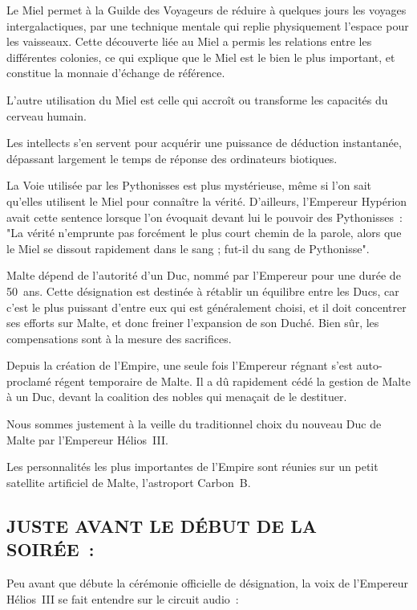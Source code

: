 \documentclass[14pt,twocolumn]{extarticle}
\begin{document}
Le Miel permet à la Guilde des Voyageurs de réduire à quelques jours les
voyages intergalactiques, par une technique mentale qui replie physiquement
l'espace pour les vaisseaux. Cette découverte liée au Miel a permis les
relations entre les différentes colonies, ce qui explique que le Miel est le
bien le plus important, et constitue la monnaie d'échange de référence.

L'autre utilisation du Miel est celle qui accroît ou transforme les capacités
du cerveau humain.

Les intellects s'en servent pour acquérir une puissance de déduction
instantanée, dépassant largement le temps de réponse des ordinateurs biotiques.

La Voie utilisée par les Pythonisses est plus mystérieuse, même si l'on sait
qu'elles utilisent le Miel pour connaître la vérité. D'ailleurs, l'Empereur
Hypérion avait cette sentence lorsque l'on évoquait devant lui le pouvoir des
Pythonisses~: "La vérité n'emprunte pas forcément le plus court chemin de la
parole, alors que le Miel se dissout rapidement dans le sang ; fut-il du
sang de Pythonisse".

Malte dépend de l'autorité d'un Duc, nommé par l'Empereur pour une durée de
50~ans. Cette désignation est destinée à rétablir un équilibre entre les Ducs,
car c'est le plus puissant d'entre eux qui est généralement choisi, et il doit
concentrer ses efforts sur Malte, et donc freiner l'expansion de son Duché.
Bien sûr, les compensations sont à la mesure des sacrifices.

Depuis la création de l'Empire, une seule fois l'Empereur régnant s'est
auto-proclamé régent temporaire de Malte. Il a dû rapidement cédé la gestion de
Malte à un Duc, devant la coalition des nobles qui menaçait de le destituer.

Nous sommes justement à la veille du traditionnel choix du nouveau Duc de Malte
par l'Empereur Hélios~III.

Les personnalités les plus importantes de l'Empire sont réunies sur un petit
satellite artificiel de Malte, l'astroport Carbon~B.

\subsection{JUSTE AVANT LE DÉBUT DE LA SOIRÉE~:}

Peu avant que débute la cérémonie officielle de désignation, la voix de
l'Empereur Hélios~III se fait entendre sur le circuit audio~:
\end{document}
